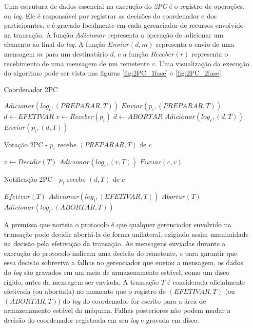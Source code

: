 \documentclass[11pt,twoside,a4paper]{book}
\begin{document}
Uma estrutura de dados essencial na execução do \emph{2PC} é o registro de operações, ou \emph{log}. Ele é responsável por registrar as decisões do coordenador e dos participantes, e é gravado localmente em cada gerenciador de recursos envolvido na transação. A função $Adicionar$ representa a operação de adicionar um elemento ao final do \emph{log}. A função $Enviar(d, m)$ representa o envio de uma mensagem $m$ para um destinatário $d$, e a função $Receber(r)$ representa o recebimento de uma mensagem de um remetente $r$. Uma visualização da execução do algoritmo pode ser vista nas figuras \ref{fig:2PC_1fase} e \ref{fig:2PC_2fase}.

\begin{algorithm}
\caption{Coordenador 2PC}
\label{alg:2pc_coordenador}
\begin{algorithmic}[1]
\State $Adicionar(log_c, (PREPARAR, T))$
	\State $Enviar(p_i, (PREPARAR, T))$
\EndFor
\State $d \gets EFETIVAR$
	\State $v \gets Receber(p_i)$
		\State $d \gets ABORTAR$
	\EndIf
\EndFor
\State $Adicionar(log_c, (d, T))$
	\State $Enviar(p_i, (d, T))$
\EndFor
\end{algorithmic}
\end{algorithm}

\begin{algorithm}
\caption{Votação 2PC - $p_i$ recebe $(PREPARAR, T)$ de $c$}
\label{alg:2pc_participante1}
\begin{algorithmic}[1]
\State $v \gets Decidir(T)$
\State $Adicionar(log_i, (v, T))$
\State $Enviar(c, v)$
\end{algorithmic}
\end{algorithm}

\begin{algorithm}
\caption{Notificação 2PC - $p_i$ recebe $(d, T)$ de $c$}
\label{alg:2pc_participante2}
\begin{algorithmic}[1]
	\State $Efetivar(T)$
	\State $Adicionar(log_i, (EFETIVAR, T))$
\Else
	\State $Abortar(T)$
	\State $Adicionar(log_i, (ABORTAR, T))$
\EndIf
\end{algorithmic}
\end{algorithm}

A premissa que norteia o protocolo é que qualquer gerenciador envolvido na transação pode decidir abortá-la de forma unilateral, exigindo assim unanimidade na decisão pela efetivação da transação. As mensagens enviadas durante a execução do protocolo indicam uma decisão do remetente, e para garantir que essa decisão sobreviva a falhas no gerenciador que enviou a mensagem, os dados do \emph{log} são gravados em um meio de armazenamento estável, como um disco rígido, antes da mensagem ser enviada. A transação $T$ é considerada oficialmente efetivada (ou abortada) no momento que o registro de $(EFETIVAR, T)$ (ou $(ABORTAR, T)$) do \emph{log} do coordenador for escrito para a área de armazenamento estável da máquina. Falhas posteriores não podem mudar a decisão do coordenador registrada em seu \emph{log} e gravada em disco.
\end{document}
